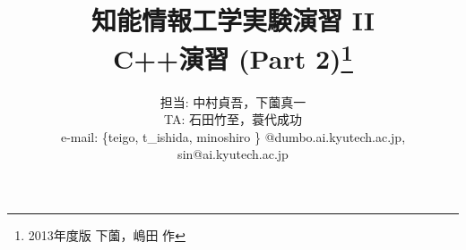 %
%
\title{{\normalsize 知能情報工学実験演習 II }\\
\bf C++演習 (Part 2)\footnote{2013年度版 下薗，嶋田 作} }
\author{担当: 中村貞吾，下薗真一\\
TA: 石田竹至，蓑代成功\\
\small
e-mail: 
{\sf \{teigo,  t\_ishida, minoshiro \} @dumbo.ai.kyutech.ac.jp},\\
\small
{\sf sin@ai.kyutech.ac.jp}
}
\date{}
%
%
\def\linesparpage#1{\baselineskip=\textheight\divide\baselineskip#1}
\setcounter{execnumber}{0}
\newcommand{\EXERCISE}[1]{
 \refstepcounter{execnumber}
 \begin{center}
  \fbox{
   \begin{minipage}{\textwidth}
    \noindent
    {\bf 演習 \arabic{execnumber}}
    #1
   \end{minipage}
  }
 \end{center}
}
\setcounter{pntnumber}{0}
\newcommand{\POINT}[2]{
 \medskip
 \refstepcounter{pntnumber}
\noindent
■■■■■ {\sf Point \arabic{pntnumber}:} {\bf #1} \hrulefill ■ \\
{\small #2}

\noindent
■ \hrulefill ■■■■■ \\
 \medskip
}

\setlength{\textwidth}{165mm}       %
\setlength{\textheight}{255mm}      %
\setlength{\oddsidemargin}{-2mm}     %
\setlength{\evensidemargin}{0mm}    %
\setlength{\topmargin}{-20mm}         %


